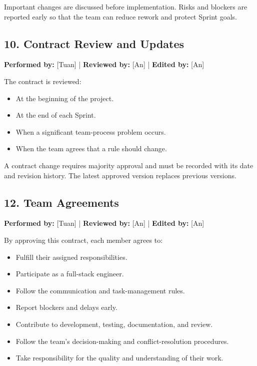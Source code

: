 \documentclass[12pt]{article}
\begin{document}
Important changes are discussed before implementation. Risks and blockers are reported early so that the team can reduce rework and protect Sprint goals.

\subsection{10. Contract Review and Updates}

\textbf{Performed by:} [Tuan] | \textbf{Reviewed by:} [An] | \textbf{Edited by:} [An]

The contract is reviewed:

\begin{itemize}
    \item At the beginning of the project.
    \item At the end of each Sprint.
    \item When a significant team-process problem occurs.
    \item When the team agrees that a rule should change.
\end{itemize}

A contract change requires majority approval and must be recorded with its date and revision history. The latest approved version replaces previous versions.

\subsection{12. Team Agreements}

\textbf{Performed by:} [Tuan] | \textbf{Reviewed by:} [An] | \textbf{Edited by:} [An]

By approving this contract, each member agrees to:

\begin{itemize}
    \item Fulfill their assigned responsibilities.
    \item Participate as a full-stack engineer.
    \item Follow the communication and task-management rules.
    \item Report blockers and delays early.
    \item Contribute to development, testing, documentation, and review.
    \item Follow the team's decision-making and conflict-resolution procedures.
    \item Take responsibility for the quality and understanding of their work.
\end{itemize}
\end{document}
